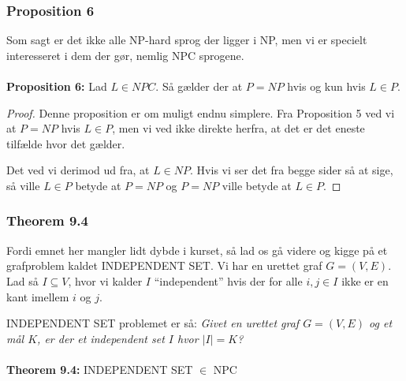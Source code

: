 \subsubsection{Proposition 6}

Som sagt er det ikke alle NP-hard sprog der ligger i NP, men vi er specielt interesseret i dem der gør, nemlig NPC sprogene.\\
~\\
\textbf{Proposition 6:} Lad $L \in NPC$. Så gælder der at $P=NP$ hvis og kun hvis $L \in P$.

\begin{proof}
 Denne proposition er om muligt endnu simplere. Fra Proposition 5 ved vi at $P=NP$ hvis $L \in P$, men vi ved ikke direkte herfra, at det er det eneste tilfælde hvor det gælder. 

Det ved vi derimod ud fra, at $L \in NP$. Hvis vi ser det fra begge sider så at sige, så ville $L \in P$ betyde at $P=NP$ og $P=NP$ ville betyde at $L \in P$.
\end{proof}

\subsubsection{Theorem 9.4}

Fordi emnet her mangler lidt dybde i kurset, så lad os gå videre og kigge på et grafproblem kaldet INDEPENDENT SET. Vi har en urettet graf $G=(V,E)$. Lad så $I \subseteq V$, hvor vi kalder $I$ ``independent'' hvis der for alle $i,j \in I$ ikke er en kant imellem $i$ og $j$. 

INDEPENDENT SET problemet er så: \textit{Givet en urettet graf $G=(V,E)$ og et mål $K$, er der et independent set $I$ hvor $|I|=K$?}\\
~\\
\textbf{Theorem 9.4:} INDEPENDENT SET $\in$ NPC


